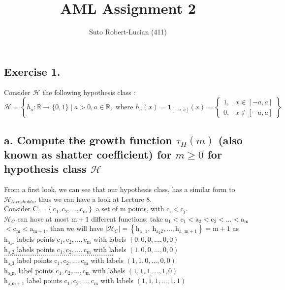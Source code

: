 \documentclass[11pt, a4paper]{article}
\title{AML Assignment 2}
\author{Suto Robert-Lucian (411)}
\date{}
\begin{document}
\maketitle
\begin{large}

\section{Exercise 1.}
Consider $\mathcal{H}$ the following hypothesis class :
$$
\mathcal{H}=\left\{h_a: \mathbb{R} \rightarrow\{0,1\} \mid a>0, a \in \mathbb{R}, \text { where } h_a(x)=\mathbf{1}_{[-a, a]}(x)=\left\{\begin{array}{ll}
1, & x \in[-a, a] \\
0, & x \notin[-a, a]
\end{array}\right\}\right.
$$
\subsection{a. Compute the growth function $\tau_H(m)$ (also known as shatter coefficient) for $m \geq 0$ for hypothesis class $\mathcal{H}$}

From a first look, we can see that our hypothesis class, has a similar form to $\mathcal{H}_{thresholds}$, thus we can have a look at Lecture 8.
\\

Consider $\mathrm{C}=\left\{\mathrm{c}_1, \mathrm{c}_2, \ldots, \mathrm{c}_{\mathrm{m}}\right\}$ a set of $\mathrm{m}$ points, with $\mathrm{c}_{\mathrm{i}}<\mathrm{c}_{\mathrm{j}}$. \\
$\mathcal{H}_C$ can have at most $\mathrm{m}+1$ different functions: take $\mathrm{a}_1<\mathrm{c}_1<\mathrm{a}_2<\mathrm{c}_2<\ldots<\mathrm{a}_{\mathrm{m}}$ $<\mathrm{c}_{\mathrm{m}}<\mathrm{a}_{\mathrm{m}+1}$, than we will have $\left|\mathcal{H}_C\right|=\left\{\mathrm{h}_{\mathrm{a}_{-} 1}, \mathrm{~h}_{\mathrm{a}_2 2}, \ldots, \mathrm{h}_{\mathrm{a}_{-} \mathrm{m}+1}\right\}=\mathrm{m}+1$ as\\
$\mathrm{h}_{\mathrm{a} \_1}$ labels points $\mathrm{c}_1, \mathrm{c}_2, \ldots, \mathrm{c}_{\mathrm{m}}$ with labels $(0,0,0, \ldots, 0,0)$\\
$\mathrm{h}_{\mathrm{a} \_2}$ labels points $\mathrm{c}_1, \mathrm{c}_2, \ldots, \mathrm{c}_{\mathrm{m}}$ with labels $(1,0,0, \ldots, 0,0)$\\
$\ldots\ldots\ldots\ldots\ldots\ldots\ldots\ldots\ldots\ldots\ldots\ldots
\ldots\ldots\ldots\ldots\ldots\ldots\ldots$\\
$\mathrm{h}_{\mathrm{a} \_3}$ label points $\mathrm{c}_1, \mathrm{c}_2, \ldots, \mathrm{c}_{\mathrm{m}}$ with labels $(1,1,0, \ldots, 0,0)$\\
$\mathrm{h}_{\mathrm{a} \_\mathrm{m}}$ label points $\mathrm{c}_1, \mathrm{c}_2, \ldots, \mathrm{c}_{\mathrm{m}}$ with labels $(1,1,1, \ldots, 1,0)$\\
$\mathrm{h}_{\mathrm{a} \_\mathrm{m}+1}$ label points $\mathrm{c}_1, \mathrm{c}_2, \ldots, \mathrm{c}_{\mathrm{m}}$ with labels $(1,1,1, \ldots, 1,1)$
\\


\end{large}
\end{document}
